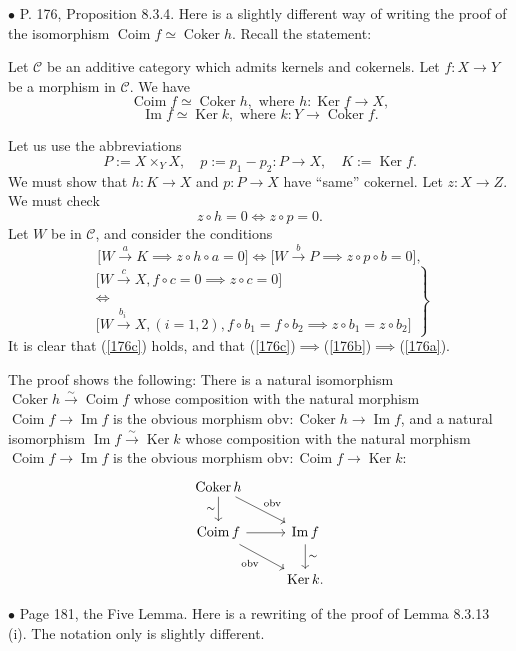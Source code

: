 \documentclass[12pt]{article}
\theoremstyle{remark}
\newcommand{\bu}{\bullet}
\newcommand{\n}{\noindent}
\newcommand{\C}{\mathcal C}
\DeclareMathOperator{\Coim}{Coim}
\DeclareMathOperator{\Coker}{Coker}
\DeclareMathOperator{\Ima}{Im}
\DeclareMathOperator{\Ker}{Ker}
\begin{document}

\n$\bu$ P. 176, Proposition 8.3.4. Here is a slightly different way of writing the proof of the isomorphism $\Coim f\simeq\Coker h$. Recall the statement: 

Let $\C$ be an additive category which admits kernels and cokernels. Let $f:X\to Y$ be a morphism in $\C$. We have 
$$ 
\Coim f\simeq\Coker h,\text{ where }h:\Ker f\to X, 
$$ 
$$ 
\Ima f\simeq\Ker k,\text{ where }k:Y\to\Coker f.  
$$ 

Let us use the abbreviations 
$$
P:=X\times_YX,\quad p:=p_1-p_2:P\to X,\quad K:=\Ker f.
$$
We must show that $h:K\to X$ and $p:P\to X$ have ``same'' cokernel. Let $z:X\to Z$. We must check 
%
\begin{equation}\label{176a}
z\circ h=0\iff z\circ p=0.
\end{equation}
%
Let $W$ be in $\C$, and consider the conditions 
%
\begin{equation}\label{176b}
\Big[W\overset{a}{\to}K\implies z\circ h\circ a=0\Big]\iff\Big[W\overset{b}{\to}P\implies z\circ p\circ b=0\Big],
\end{equation}
%
\begin{equation}\label{176c}
\left.
\begin{matrix}
\Big[W\overset{c}{\to}X,f\circ c=0\implies z\circ c=0\Big]\\ 
\iff\\ 
\Big[W\overset{b_i\ }{\to}X,(i=1,2),f\circ b_1=f\circ b_2\implies z\circ b_1=z\circ b_2\Big]
\end{matrix}
\right\}
\end{equation}
It is clear that (\ref{176c}) holds, and that (\ref{176c})$\implies$(\ref{176b})$\implies$(\ref{176a}).

The proof shows the following: There is a natural isomorphism $\Coker h\xrightarrow{\sim}\Coim f$ whose composition with the natural morphism $\Coim f\to\Ima f$ is the obvious morphism $\text{obv}:\Coker h\to\Ima f$, and a natural isomorphism $\Ima f\xrightarrow{\sim}\Ker k$ whose composition with the natural morphism $\Coim f\to\Ima f$ is the obvious morphism $\text{obv}:\Coim f\to\Ker k$: 
$$
\begin{tikzcd}
\Coker h\ar{d}[swap]{\sim}\ar{dr}{\text{obv}}\\
\Coim f\ar{r}\ar{dr}[swap]{\text{obv}}&\Ima f\ar{d}{\sim}\\
&\Ker k.
\end{tikzcd}
$$


\n$\bu$ Page 181, the Five Lemma. Here is a rewriting of the proof of Lemma 8.3.13 (i). The notation only is slightly different. 
\end{document}
